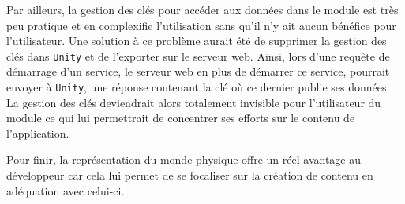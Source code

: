 Par ailleurs, la gestion des clés pour accéder aux données dans le module est très peu pratique et en complexifie l'utilisation sans qu'il n'y ait aucun bénéfice pour l'utilisateur. Une solution à ce problème aurait été de supprimer la gestion des clés dans \texttt{Unity} et de l'exporter sur le serveur web. Ainsi, lors d'une requête de démarrage d'un service, le serveur web en plus de démarrer ce service, pourrait envoyer à \texttt{Unity}, une réponse contenant la clé où ce dernier publie ses données. La gestion des clés deviendrait alors totalement invisible pour l'utilisateur du module ce qui lui permettrait de concentrer ses efforts sur le contenu de l'application.

Pour finir, la représentation du monde physique offre un réel avantage au développeur car cela lui permet de se focaliser sur la création de contenu en adéquation avec celui-ci.